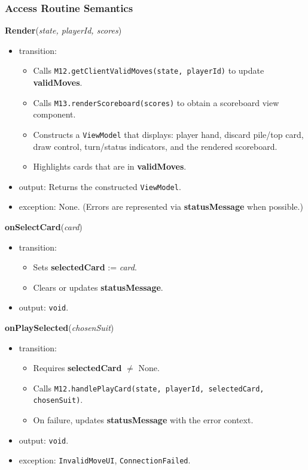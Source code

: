 \documentclass[12pt, titlepage]{article}
\begin{document}
\subsubsection{Access Routine Semantics}

\noindent\textbf{Render}(\textit{state, playerId, scores})
\begin{itemize}
    \item transition:
    \begin{itemize}
        \item Calls \texttt{M12.getClientValidMoves(state, playerId)} to update \textbf{validMoves}.
        \item Calls \texttt{M13.renderScoreboard(scores)} to obtain a scoreboard view component.
        \item Constructs a \texttt{ViewModel} that displays: player hand, discard pile/top card, draw control, turn/status indicators, and the rendered scoreboard.
        \item Highlights cards that are in \textbf{validMoves}.
    \end{itemize}
    \item output: Returns the constructed \texttt{ViewModel}.
    \item exception: None. (Errors are represented via \textbf{statusMessage} when possible.)
\end{itemize}

\noindent\textbf{onSelectCard}(\textit{card})
\begin{itemize}
    \item transition:
    \begin{itemize}
        \item Sets \textbf{selectedCard} := \textit{card}.
        \item Clears or updates \textbf{statusMessage}.
    \end{itemize}
    \item output: \texttt{void}.
\end{itemize}

\noindent\textbf{onPlaySelected}(\textit{chosenSuit})
\begin{itemize}
    \item transition:
    \begin{itemize}
        \item Requires \textbf{selectedCard} $\neq$ None.
        \item Calls \texttt{M12.handlePlayCard(state, playerId, selectedCard, chosenSuit)}.
        \item On failure, updates \textbf{statusMessage} with the error context.
    \end{itemize}
    \item output: \texttt{void}.
    \item exception: \texttt{InvalidMoveUI}, \texttt{ConnectionFailed}.
\end{itemize}
\end{document}
